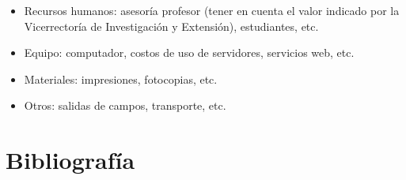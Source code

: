 \documentclass[12pt]{article}
\begin{document}
    \begin{itemize}
        
        \item Recursos humanos:  asesoría profesor (tener en cuenta el valor indicado por la Vicerrectoría de Investigación y Extensión), estudiantes, etc.
        \item Equipo:  computador, costos de uso de servidores, servicios web, etc.
        \item Materiales:  impresiones, fotocopias, etc.
        \item Otros:  salidas de campos, transporte, etc.
        
    \end{itemize}

    \pagebreak

    \section{Bibliografía}

    
\end{document}
